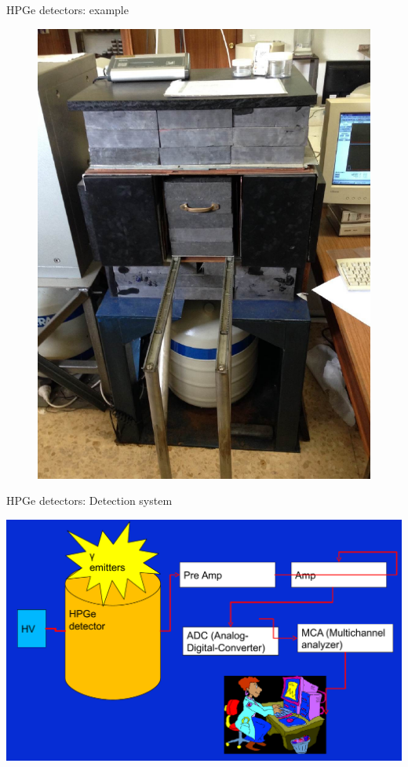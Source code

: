 \begin{frame}{HPGe detectors: example}
\begin{figure}
\includegraphics[scale=0.25]{figures/hpgelaruc2.png}
\end{figure}
\end{frame}

\begin{frame}{HPGe detectors: Detection system}


\centering
\includegraphics[scale=0.25]{figures/detectionsystem.png}

\end{frame}

